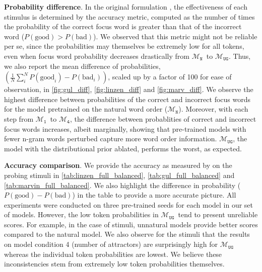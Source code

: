 \documentclass[letterpaper, 12pt]{report}
\newcommand{\xhdr}[1]{{\noindent\bfseries #1}.}
\newcommand{\OR}{$\mathcal{M}_{\texttt{N}}$}
\newcommand{\RI}{$\mathcal{M}_{\texttt{1}}$}
\newcommand{\RIV}{$\mathcal{M}_{\texttt{4}}$}
\newcommand{\RC}{$\mathcal{M}_{\texttt{UG}}$}
\begin{document}
\xhdr{Probability difference} In the original formulation \citep{goldberga, wolf2019}, the effectiveness of each stimulus is determined by the accuracy metric, computed as the number of times the probability of the correct focus word is greater than that of the incorrect word ($P(\textrm{good}) > P(\textrm{bad})$). We observed that this metric might not be reliable per se, since the probabilities may themselves be extremely low for all tokens, even when focus word probability decreases drastically from \OR\ to \RC.
Thus, we also report the mean difference of probabilities, $(\frac{1}{N}\sum_{i}^N P(\textrm{good}_i) - P(\textrm{bad}_i))$, scaled up by a factor of 100 for ease of observation, in \autoref{fig:gul_diff}, \autoref{fig:linzen_diff} and \autoref{fig:marv_diff}.
We observe the highest difference between probabilities of the correct and incorrect focus words for the model pretrained on the natural word order (\OR). Moreover, with each step from \RI\ to \RIV, the difference between probablities of correct and incorrect focus words increases, albeit marginally, showing that pre-trained models with fewer n-gram words perturbed capture more word order information. \RC, the model with the distributional prior ablated, performs the worst, as expected.





\xhdr{Accuracy comparison}
We provide the accuracy as measured by \citet{goldberga, wolf2019} on the probing stimuli in \autoref{tab:linzen_full_balanced}, \autoref{tab:gul_full_balanced} and \autoref{tab:marvin_full_balanced}. We also highlight the difference in probability ($P(\textrm{good}) - P(\textrm{bad})$) in the table to provide a more accurate picture. All experiments were conducted on three pre-trained seeds for each model in our set of models. However, the low token probabilities in \RC\ tend to present unreliable scores. For example, in the case of \citet{gulordava2018} stimuli, unnatural models provide better scores compared to the natural model. We also observe for the \citet{linzen-etal-2016-assessing} stimuli that the results on model condition 4 (number of attractors) are surprisingly high for \RC\, whereas the individual token probabilities are lowest. We believe these inconsistencies stem from extremely low token probabilities themselves.  %
\end{document}
